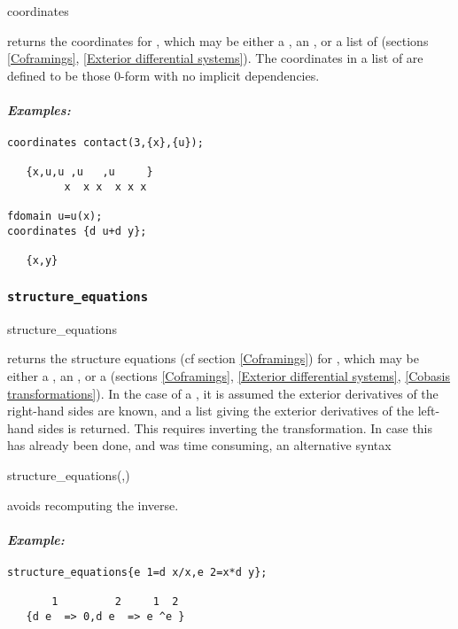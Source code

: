 \begin{edssyntax}
	coordinates 
\end{edssyntax}
returns the coordinates for , which may be either a
, an , or a list of  (sections
\ref{Coframings}, \ref{Exterior differential systems}). The coordinates in a
list of  are defined to be those 0-form  with no
implicit dependencies.

\paragraph{\it Examples:}
\begin{verbatim}
coordinates contact(3,{x},{u});

   {x,u,u ,u   ,u     }
         x  x x  x x x 

fdomain u=u(x);
coordinates {d u+d y};

   {x,y} 
\end{verbatim}

\subsubsection{\tt structure\_equations}
\label{structure_equations}

\begin{edssyntax}
	structure\_equations 
\end{edssyntax}
returns the structure equations (cf section \ref{Coframings}) for
, which may be either a , an , or a
 (sections \ref{Coframings}, \ref{Exterior differential
systems}, \ref{Cobasis transformations}). In the case of a
, it is assumed the exterior derivatives of the right-hand
sides are known, and a list giving the exterior derivatives of the
left-hand sides is returned. This requires inverting the transformation. In
case this has already been done, and was time consuming, an alternative
syntax
\begin{edssyntax}
	structure\_equations(,)
\end{edssyntax}
avoids recomputing the inverse.

\paragraph{\it Example:}
\begin{verbatim}
structure_equations{e 1=d x/x,e 2=x*d y};

       1         2     1  2
   {d e  => 0,d e  => e ^e } 
\end{verbatim}

